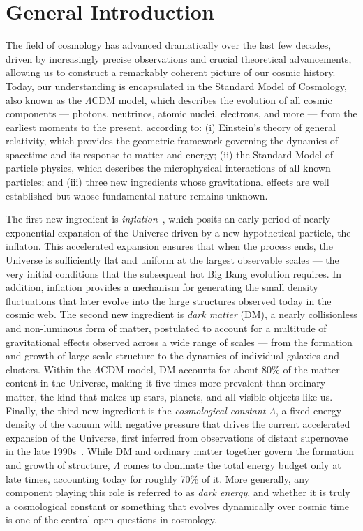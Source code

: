 \chapter{General Introduction}
\label{ch:introduction}

The field of cosmology has advanced dramatically over the last few decades, driven by increasingly precise observations and crucial theoretical advancements, allowing us to construct a remarkably coherent picture of our cosmic history. Today, our understanding is encapsulated in the Standard Model of Cosmology, also known as the $\Lambda$CDM model, which describes the evolution of all cosmic components --- photons, neutrinos, atomic nuclei, electrons, and more --- from the earliest moments to the present, according to: (i) Einstein's theory of general relativity, which provides the geometric framework governing the dynamics of spacetime and its response to matter and energy; (ii) the Standard Model of particle physics, which describes the microphysical interactions of all known particles; and (iii) three new ingredients whose gravitational effects are well established but whose fundamental nature remains unknown.

The first new ingredient is \textit{inflation}~\citep{Guth:1980zm,Linde:1981mu, Albrecht:1982wi,Kazanas:1980tx, Starobinsky:1980te, Sato:1981ds, Sato:1980yn, Mukhanov:1981xt, Linde:1983gd,Mukhanov:2003xw}, which posits an early period of nearly exponential expansion of the Universe driven by a new hypothetical particle, the inflaton. This accelerated expansion ensures that when the process ends, the Universe is sufficiently flat and uniform at the largest observable scales --- the very initial conditions that the subsequent hot Big Bang evolution requires. In addition, inflation provides a mechanism for generating the small density fluctuations that later evolve into the large structures observed today in the cosmic web. The second new ingredient is \textit{dark matter} (DM), a nearly collisionless and non-luminous form of matter, postulated to account for a multitude of gravitational effects observed across a wide range of scales --- from the formation and growth of large-scale structure to the dynamics of individual galaxies and clusters. Within the $\Lambda$CDM model, DM  accounts for about $80\%$ of the matter content in the Universe, making it five times more prevalent than ordinary matter, the kind that makes up stars, planets, and all visible objects like us. Finally, the third new ingredient is the \textit{cosmological constant} $\Lambda$, a fixed energy density of the vacuum with negative pressure that drives the current accelerated expansion of the Universe, first inferred from observations of distant supernovae in the late 1990s~\cite{SupernovaCosmologyProject:1998vns, SupernovaSearchTeam:1998fmf}. While DM and ordinary matter together govern the formation and growth of structure, $\Lambda$ comes to dominate the total energy budget only at late times, accounting today for roughly 70\% of it. More generally, any component playing this role is referred to as \textit{dark energy}, and whether it is truly a cosmological constant or something that evolves dynamically over cosmic time is one of the central open questions in cosmology.


